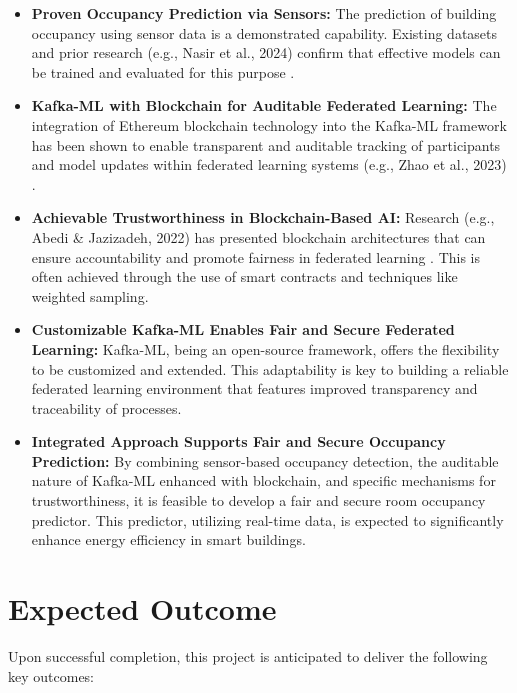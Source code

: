 \begin{itemize}
    \item \textbf{Proven Occupancy Prediction via Sensors:} The prediction of building occupancy using sensor data is a demonstrated capability.
Existing datasets and prior research (e.g., Nasir et al., 2024) confirm that effective models can be trained and evaluated for this purpose \cite{khan2022occupancy}.
    \item \textbf{Kafka-ML with Blockchain for Auditable Federated Learning:} The integration of Ethereum blockchain technology into the Kafka-ML framework has been shown to enable transparent and auditable tracking of participants and model updates within federated learning systems (e.g., Zhao et al., 2023) \cite{chaves2024federated}.
    \item \textbf{Achievable Trustworthiness in Blockchain-Based AI:} Research (e.g., Abedi \& Jazizadeh, 2022) has presented blockchain architectures that can ensure accountability and promote fairness in federated learning \cite{lo2022toward,ali2023explainable}.
This is often achieved through the use of smart contracts and techniques like weighted sampling.
    \item \textbf{Customizable Kafka-ML Enables Fair and Secure Federated Learning:} Kafka-ML, being an open-source framework, offers the flexibility to be customized and extended.
This adaptability is key to building a reliable federated learning environment that features improved transparency and traceability of processes.
    \item \textbf{Integrated Approach Supports Fair and Secure Occupancy Prediction:} By combining sensor-based occupancy detection, the auditable nature of Kafka-ML enhanced with blockchain, and specific mechanisms for trustworthiness, it is feasible to develop a fair and secure room occupancy predictor.
This predictor, utilizing real-time data, is expected to significantly enhance energy efficiency in smart buildings.
\end{itemize}


\section{Expected Outcome}
\label{sec:expected_outcome}

Upon successful completion, this project is anticipated to deliver the following key outcomes:

